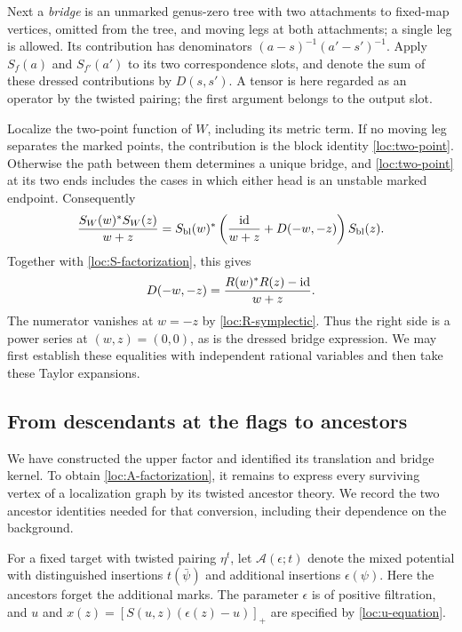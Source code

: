 Next a \emph{bridge} is an unmarked genus-zero tree with two
attachments to fixed-map vertices, omitted from the tree, and moving
legs at both attachments; a single leg is allowed. Its contribution
has denominators $(a-s)^{-1}(a'-s')^{-1}$. Apply $S_f(a)$ and
$S_{f'}(a')$ to its two correspondence slots, and denote the sum of
these dressed contributions by $D(s,s')$. A tensor is here regarded
as an operator by the twisted pairing; the first argument belongs to
the output slot.

Localize the two-point function of $W$, including its metric term.
If no moving leg separates the marked points, the contribution is the
block identity \eqref{loc:two-point}. Otherwise the path between
them determines a unique bridge, and \eqref{loc:two-point} at its
two ends includes the cases in which either head is an unstable
marked endpoint. Consequently
\begin{equation}\label{loc:bridge-two-point}
 \frac{S_W(w)^*S_W(z)}{w+z}
 =S_{\mathrm{bl}}(w)^*
       \left(\frac{\operatorname{id}}{w+z}+D(-w,-z)\right)
       S_{\mathrm{bl}}(z).
\end{equation}
Together with \eqref{loc:S-factorization}, this gives
\begin{equation}\label{loc:bridge-kernel}
              D(-w,-z)=\frac{R(w)^*R(z)-\operatorname{id}}{w+z}.
\end{equation}
The numerator vanishes at $w=-z$ by
\eqref{loc:R-symplectic}. Thus the right side is a power series at
$(w,z)=(0,0)$, as is the dressed bridge expression. We may first
establish these equalities with independent rational variables and
then take these Taylor expansions.

\subsection{From descendants at the flags to ancestors}

We have constructed the upper factor and identified its translation
and bridge kernel. To obtain \eqref{loc:A-factorization}, it remains
to express every surviving vertex of a localization graph by its
twisted ancestor theory. We record the two ancestor identities needed
for that conversion, including their dependence on the background.

For a fixed target with twisted pairing $\eta^t$, let
$\mathcal A(\epsilon;t)$ denote the mixed potential with distinguished
insertions $t(\bar\psi)$ and additional insertions $\epsilon(\psi)$.
Here the ancestors forget the additional marks. The parameter
$\epsilon$ is of positive filtration, and $u$ and
$x(z)=[S(u,z)(\epsilon(z)-u)]_+$ are specified by
\eqref{loc:u-equation}.

